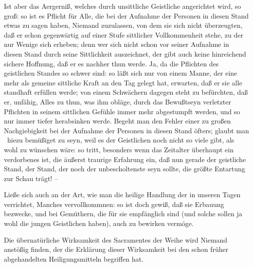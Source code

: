 \begin{aufza}
\begin{aufzb}
\end{aufzb}
\item Ist aber das Aergerniß, welches durch unsittliche Geistliche angerichtet wird, so groß: so ist es Pflicht für Alle, die bei der Aufnahme der Personen in diesen Stand etwas zu sagen haben, Niemand zuzulassen, von dem sie sich nicht überzeugten, daß er schon gegenwärtig auf einer Stufe sittlicher Vollkommenheit stehe, zu der nur Wenige sich erheben; denn wer sich nicht schon vor seiner Aufnahme in diesen Stand durch seine Sittlichkeit auszeichnet, der gibt auch keine hinreichend sichere Hoffnung, daß er es nachher thun werde. Ja, da die Pflichten des geistlichen Standes so schwer sind: so läßt sich nur von einem Manne, der eine mehr als gemeine sittliche Kraft an den Tag gelegt hat, erwarten, daß er sie alle standhaft erfüllen werde; von einem Schwächern dagegen steht zu befürchten, daß er, unfähig, Alles zu thun, was ihm obläge, durch das Bewußtseyn verletzter Pflichten in seinem sittlichen Gefühle immer mehr abgestumpft werden, und so nur immer tiefer herabsinken werde. Begeht man den Fehler einer zu großen Nachgiebigkeit bei der Aufnahme der Personen in diesen Stand öfters; glaubt man \zB\  hiezu bemüßiget zu seyn, weil es der Geistlichen noch nicht so viele gibt, als wohl zu wünschen wäre: so tritt, besonders wenn das Zeitalter überhaupt ein verdorbenes ist, die äußerst traurige Erfahrung ein, daß nun gerade der geistliche Stand, der Stand, der noch der unbescholtenste seyn sollte, die größte Entartung zur Schau trägt! --
\item Ließe sich auch an der Art, wie man die heilige Handlung der  in unseren Tagen verrichtet, Manches vervollkommnen: so ist doch gewiß, daß sie Erbauung bezwecke, und bei Gemüthern, die für sie empfänglich sind (und solche sollen ja wohl die jungen Geistlichen haben), auch zu bewirken vermöge.
\item Die übernatürliche Wirksamkeit des Sacramentes der Weihe wird Niemand anstößig finden, der die Erklärung dieser Wirksamkeit bei den schon früher abgehandelten Heiligungsmitteln begriffen hat.

\end{aufza}
